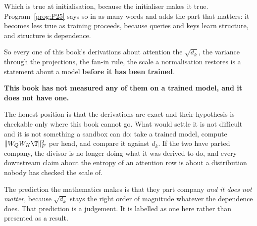 \begin{fr}

Which is true at initialisation, because the initialiser makes it true.
Program~\ref{prog:P25} says so in as many words and adds the part that
matters: it becomes less true as training proceeds, because queries and keys
learn structure, and structure is dependence.

So every one of this book's derivations about attention \dash{} the
$\sqrt{d_k}$, the variance through the projections, the fan-in rule, the
scale a normalisation restores \dash{} is a statement about a model
\textbf{before it has been trained}.

\begin{warning}
\textbf{This book has not measured any of them on a trained model, and it
does not have one.}

The honest position is that the derivations are exact and their hypothesis
is checkable only where this book cannot go. What would settle it is not
difficult and it is not something a sandbox can do: take a trained model,
compute $\lVert W_Q W_K\T\rVert_F^{2}$ per head, and compare it against
$d_k$. If the two have parted company, the divisor is no longer doing what
it was derived to do, and every downstream claim about the entropy of an
attention row is about a distribution nobody has checked the scale of.

The prediction the mathematics makes is that they part company \emph{and it
does not matter}, because $\sqrt{d_k}$ stays the right order of magnitude
whatever the dependence does. That prediction is a judgement. It is
labelled as one here rather than presented as a result.
\end{warning}
\end{fr}

